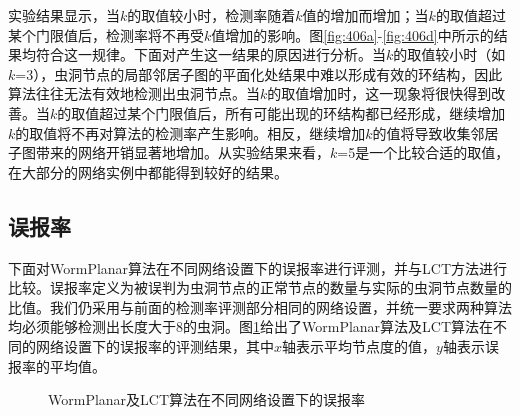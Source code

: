 实验结果显示，当$k$的取值较小时，检测率随着$k$值的增加而增加；当$k$的取值超过某个门限值后，检测率将不再受$k$值增加的影响。图\ref{fig:406a}-\ref{fig:406d}中所示的结果均符合这一规律。下面对产生这一结果的原因进行分析。当$k$的取值较小时（如$k$=3），虫洞节点的局部邻居子图的平面化处结果中难以形成有效的环结构，因此算法往往无法有效地检测出虫洞节点。当$k$的取值增加时，这一现象将很快得到改善。当$k$的取值超过某个门限值后，所有可能出现的环结构都已经形成，继续增加$k$的取值将不再对算法的检测率产生影响。相反，继续增加$k$的值将导致收集邻居子图带来的网络开销显著地增加。从实验结果来看，$k$=5是一个比较合适的取值，在大部分的网络实例中都能得到较好的结果。
\subsection{误报率}
下面对WormPlanar算法在不同网络设置下的误报率进行评测，并与LCT方法进行比较。误报率定义为被误判为虫洞节点的正常节点的数量与实际的虫洞节点数量的比值。我们仍采用与前面的检测率评测部分相同的网络设置，并统一要求两种算法均必须能够检测出长度大于8的虫洞。图\ref{fig:407}给出了WormPlanar算法及LCT算法在不同的网络设置下的误报率的评测结果，其中$x$轴表示平均节点度的值，$y$轴表示误报率的平均值。
\begin{figure}[t]
  \centering
  \hspace{0.5em}%
  \hspace{0.5em}%
  \hspace{0.5em}%
  \caption{WormPlanar及LCT算法在不同网络设置下的误报率}
  \label{fig:407}
\end{figure}

